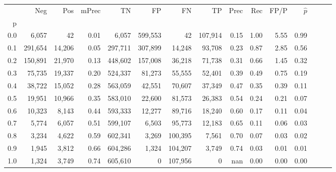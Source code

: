 \begin{tabular}{rrrrrrrrrrrrrrr}
\toprule
{} &      Neg &     Pos & mPrec &       TN &       FP &       FN &       TP &  Prec &   Rec &  FP/P & $\hat{p}$ \\
p   &          &         &       &          &          &          &          &       &       &       &           \\
\midrule
0.0 &    6,057 &      42 &  0.01 &    6,057 &  599,553 &       42 &  107,914 &  0.15 &  1.00 &  5.55 &      0.99 \\
0.1 &  291,654 &  14,206 &  0.05 &  297,711 &  307,899 &   14,248 &   93,708 &  0.23 &  0.87 &  2.85 &      0.56 \\
0.2 &  150,891 &  21,970 &  0.13 &  448,602 &  157,008 &   36,218 &   71,738 &  0.31 &  0.66 &  1.45 &      0.32 \\
0.3 &   75,735 &  19,337 &  0.20 &  524,337 &   81,273 &   55,555 &   52,401 &  0.39 &  0.49 &  0.75 &      0.19 \\
0.4 &   38,722 &  15,052 &  0.28 &  563,059 &   42,551 &   70,607 &   37,349 &  0.47 &  0.35 &  0.39 &      0.11 \\
0.5 &   19,951 &  10,966 &  0.35 &  583,010 &   22,600 &   81,573 &   26,383 &  0.54 &  0.24 &  0.21 &      0.07 \\
0.6 &   10,323 &   8,143 &  0.44 &  593,333 &   12,277 &   89,716 &   18,240 &  0.60 &  0.17 &  0.11 &      0.04 \\
0.7 &    5,774 &   6,057 &  0.51 &  599,107 &    6,503 &   95,773 &   12,183 &  0.65 &  0.11 &  0.06 &      0.03 \\
0.8 &    3,234 &   4,622 &  0.59 &  602,341 &    3,269 &  100,395 &    7,561 &  0.70 &  0.07 &  0.03 &      0.02 \\
0.9 &    1,945 &   3,812 &  0.66 &  604,286 &    1,324 &  104,207 &    3,749 &  0.74 &  0.03 &  0.01 &      0.01 \\
1.0 &    1,324 &   3,749 &  0.74 &  605,610 &        0 &  107,956 &        0 &   nan &  0.00 &  0.00 &      0.00 \\
\bottomrule
\end{tabular}
